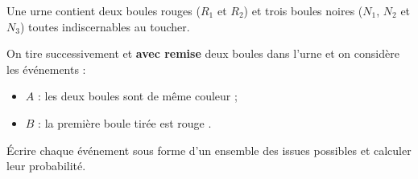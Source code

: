 \begin{exo}
	Une urne contient deux boules rouges ($R_1$ et $R_2$) et trois boules noires ($N_1$, $N_2$ et $N_3$) toutes indiscernables au toucher.

	On tire successivement et \textbf{avec remise} deux boules dans l'urne et on considère les événements :
	\begin{itemize}[label=$\bullet$]
		\item $A$ : \og{} les deux boules sont de même couleur \fg{} ;
		\item $B$ : \og{} la première boule tirée est rouge \fg{}.
	\end{itemize}

	Écrire chaque événement sous forme d'un ensemble des issues possibles et calculer leur probabilité.
\end{exo}

